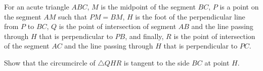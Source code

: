 For an acute triangle $ABC$, $M$ is the midpoint of the segment $BC$, $P$ is a point on the segment $AM$ such that $PM = BM$, $H$ is the foot of the perpendicular line from $P$ to $BC$, $Q$ is the point of intersection of segment $AB$ and the line passing through $H$ that is perpendicular to $PB$, and finally, $R$ is the point of intersection of the segment $AC$ and the line passing through $H$ that is perpendicular to $PC$.

Show that the circumcircle of $\triangle QHR$ is tangent to the side $BC$ at point $H$.
